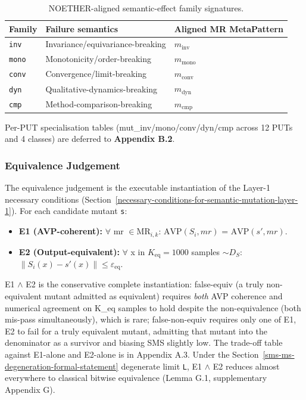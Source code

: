 \documentclass[manuscript,screen,review]{acmart}
\begin{document}
\begin{table}[t]
\caption{NOETHER-aligned semantic-effect family signatures.}\label{tab:p2-01}
\centering
\begin{tabular}{@{}lll@{}}
\toprule
Family & Failure semantics & Aligned MR MetaPattern \\
\midrule
\texttt{inv} & Invariance/equivariance-breaking & $m_{\mathrm{inv}}$ \\
\texttt{mono} & Monotonicity/order-breaking & $m_{\mathrm{mono}}$ \\
\texttt{conv} & Convergence/limit-breaking & $m_{\mathrm{conv}}$ \\
\texttt{dyn} & Qualitative-dynamics-breaking & $m_{\mathrm{dyn}}$ \\
\texttt{cmp} & Method-comparison-breaking & $m_{\mathrm{cmp}}$ \\
\bottomrule
\end{tabular}
\end{table}

Per-PUT specialisation tables (mut\_inv/mono/conv/dyn/cmp across 12 PUTs and 4
classes) are deferred to \textbf{Appendix B.2}.

\subsubsection{Equivalence Judgement}\label{equivalence-judgement-e1-e2-layer-2}

The equivalence judgement is the executable instantiation of the Layer-1
necessary conditions (Section~\ref{necessary-conditions-for-semantic-mutation-layer-1}). For each candidate mutant
\texttt{s\textquotesingle{}}:

\begin{itemize}

\item
  \textbf{E1 (AVP-coherent):} $\forall$ mr $\in \mathrm{MR}_{i,k}$: $\mathrm{AVP}(S_i, mr)$ =
  $\mathrm{AVP}(s', mr)$.
\item
  \textbf{E2 (Output-equivalent):} $\forall$ x in $K_{\mathrm{eq}}=1000$ samples
  $\sim D_S$: $\|S_i(x) - s'(x)\| \leq \varepsilon_{\mathrm{eq}}$.
\end{itemize}

E1 $\wedge$ E2 is the conservative complete instantiation: false-equiv (a
truly non-equivalent mutant admitted as equivalent) requires \emph{both}
AVP coherence and numerical agreement on K\_eq samples to hold despite the
non-equivalence (both mis-pass simultaneously), which is rare;
false-non-equiv requires only one of E1, E2 to fail for a truly equivalent
mutant, admitting that mutant into the denominator as a survivor and
biasing SMS slightly low. The trade-off table against
E1-alone and E2-alone is in Appendix A.3. Under the Section~\ref{sms-ms-degeneration-formal-statement} degenerate
limit \texttt{L}, E1 $\wedge$ E2 reduces almost everywhere to classical bitwise
equivalence (Lemma G.1, supplementary Appendix G).
\end{document}
